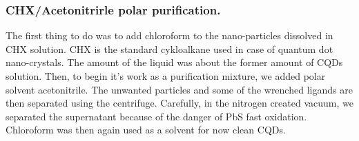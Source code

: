 \subsubsection{CHX/Acetonitrirle polar purification.} 


The first thing to do was to add chloroform to the nano-particles dissolved in CHX solution. CHX is the standard cykloalkane used in case of quantum dot nano-crystals. The amount of the liquid was about the former amount of CQDs solution. Then, to begin it's work as a purification mixture, we added polar solvent acetonitrile. The unwanted particles and some of the wrenched ligands are then separated using the centrifuge. Carefully, in the nitrogen created vacuum, we separated the supernatant because of the danger of PbS fast oxidation. Chloroform was then again used as a solvent for now clean CQDs.

